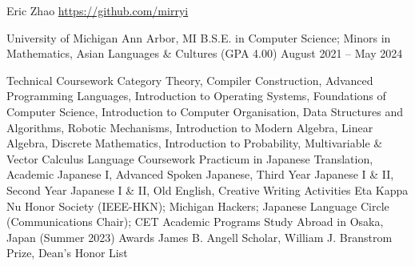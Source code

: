 \documentclass[letterpaper,11pt]{article}
\begin{document}
\rheading
  {Eric Zhao}
  {}
  {\href{https://github.com/mirryi}{https://github.com/mirryi}}
  {}

  \begin{rsectionlist}
    \rsectionitem
      {University of Michigan}
      {Ann Arbor, MI}
      {B.S.E. in Computer Science; Minors in Mathematics, Asian Languages \& Cultures (GPA 4.00)}
      {August 2021 -- May 2024}
      \begin{rpointlist}
        \rpoint
          {Technical Coursework}
          {Category Theory, Compiler Construction, Advanced Programming Languages,
            Introduction to Operating Systems, Foundations of Computer Science,
            Introduction to Computer Organisation, Data Structures and Algorithms,
            Robotic Mechanisms,
            Introduction to Modern Algebra, Linear Algebra, Discrete Mathematics,
            Introduction to Probability, Multivariable \& Vector Calculus}
        \rpoint
          {Language Coursework}
          {Practicum in Japanese Translation, Academic Japanese I, Advanced Spoken Japanese,
            Third Year Japanese I \& II, Second Year Japanese I \& II,
            Old English, Creative Writing}
        \rpoint
          {Activities}
          {Eta Kappa Nu Honor Society (IEEE-HKN); Michigan Hackers;
            Japanese Language Circle (Communications Chair);
            CET Academic Programs Study Abroad in Osaka, Japan (Summer 2023)}
        \rpoint
          {Awards}
          {James B. Angell Scholar, William J. Branstrom Prize, Dean's Honor List}
      \end{rpointlist}

  \end{rsectionlist}
\end{document}
